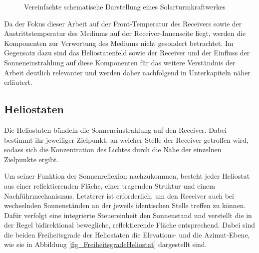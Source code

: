 \begin{figure}[h!]
    \centering
    \setlength{\fboxsep}{1pt}
    \setlength{\fboxrule}{1pt}
\caption[Vereinfachte schematische Darstellung eines Solarturmkraftwerkes]{Vereinfachte schematische Darstellung eines Solarturmkraftwerkes \cite[S. 5]{DissZanger}}
    \label{fig_SchemaSolarturmkraftwerk}
\end{figure}


Da der Fokus dieser Arbeit auf der Front-Temperatur des Receivers sowie der Austrittstemperatur des Mediums auf der Receiver-Innenseite liegt, werden die Komponenten zur Verwertung des Mediums nicht gesondert betrachtet.
Im Gegensatz dazu sind das Heliostatenfeld sowie der Receiver und der Einfluss der Sonneneinstrahlung auf diese Komponenten für das weitere Verständnis der Arbeit deutlich relevanter und werden daher nachfolgend in Unterkapiteln näher erläutert.


\subsection{Heliostaten} \label{subsec_Heliostaten}
Die Heliostaten bündeln die Sonneneinstrahlung auf den Receiver.
Dabei bestimmt ihr jeweiliger Zielpunkt, an welcher Stelle der Receiver getroffen wird, sodass sich die Konzentration des Lichtes durch die Nähe der einzelnen Zielpunkte ergibt.

Um seiner Funktion der Sonnenreflexion nachzukommen, besteht jeder Heliostat aus einer reflektierenden Fläche, einer tragenden Struktur und einem Nachführmechanismus.
Letzterer ist erforderlich, um den Receiver auch bei wechselnden Sonnenständen an der jeweils identischen Stelle treffen zu können.
Dafür verfolgt eine integrierte Steuereinheit den Sonnenstand und verstellt die in der Regel bidirektional bewegliche, reflektierende Fläche entsprechend.
Dabei sind die beiden Freiheitsgrade der Heliostaten die Elevations- und die Azimut-Ebene, wie sie in Abbildung \ref{fig_FreiheitsgradeHeliostat} dargestellt sind. \cite[S. 13]{DissBelhomme}

